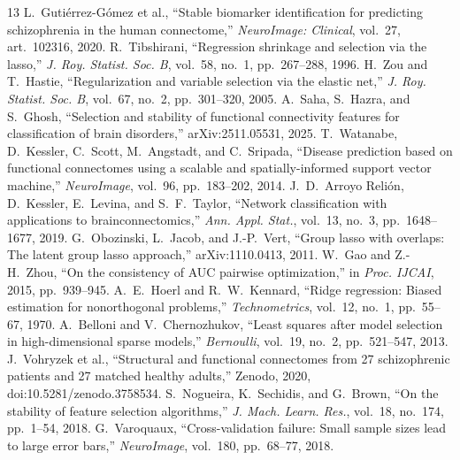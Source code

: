 \documentclass{article}
\begin{document}
\begin{thebibliography}{13}
\small
\setlength{\emergencystretch}{1em}
 L.~Guti\'errez-G\'omez et al., ``Stable biomarker identification for predicting schizophrenia in the human connectome,'' \emph{NeuroImage: Clinical}, vol.~27, art.~102316, 2020.
 R.~Tibshirani, ``Regression shrinkage and selection via the lasso,'' \emph{J. Roy. Statist. Soc. B}, vol.~58, no.~1, pp.~267--288, 1996.
 H.~Zou and T.~Hastie, ``Regularization and variable selection via the elastic net,'' \emph{J. Roy. Statist. Soc. B}, vol.~67, no.~2, pp.~301--320, 2005.
 A.~Saha, S.~Hazra, and S.~Ghosh, ``Selection and stability of functional connectivity features for classification of brain disorders,'' arXiv:2511.05531, 2025.
 T.~Watanabe, D.~Kessler, C.~Scott, M.~Angstadt, and C.~Sripada, ``Disease prediction based on functional connectomes using a scalable and spatially-informed support vector machine,'' \emph{NeuroImage}, vol.~96, pp.~183--202, 2014.
 J.~D.~Arroyo Reli\'on, D.~Kessler, E.~Levina, and S.~F.~Taylor, ``Network classification with applications to brain\newline connectomics,'' \emph{Ann. Appl. Stat.}, vol.~13, no.~3, pp.~1648--1677, 2019.
 G.~Obozinski, L.~Jacob, and J.-P.~Vert, ``Group lasso with overlaps: The latent group lasso approach,'' arXiv:1110.0413, 2011.
 W.~Gao and Z.-H.~Zhou, ``On the consistency of AUC pairwise optimization,'' in \emph{Proc. IJCAI}, 2015, pp.~939--945.
 A.~E.~Hoerl and R.~W.~Kennard, ``Ridge regression: Biased estimation for nonorthogonal problems,'' \emph{Technometrics}, vol.~12, no.~1, pp.~55--67, 1970.
 A.~Belloni and V.~Chernozhukov, ``Least squares after model selection in high-dimensional sparse models,'' \emph{Bernoulli}, vol.~19, no.~2, pp.~521--547, 2013.
 J.~Vohryzek et al., ``Structural and functional connectomes from 27 schizophrenic patients and 27 matched healthy adults,'' Zenodo, 2020, doi:10.5281/zenodo.3758534.
 S.~Nogueira, K.~Sechidis, and G.~Brown, ``On the stability of feature selection algorithms,'' \emph{J. Mach. Learn. Res.}, vol.~18, no.~174, pp.~1--54, 2018.
 G.~Varoquaux, ``Cross-validation failure: Small sample sizes lead to large error bars,'' \emph{NeuroImage}, vol.~180, pp.~68--77, 2018.
\end{thebibliography}
\end{document}
